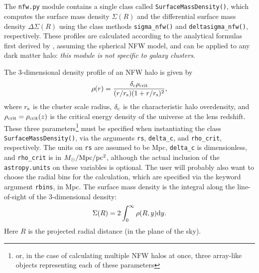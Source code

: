 \documentclass{emulateapj}
\newcommand{\code}{\lstinline[style=codeintext]}
\newcommand{\hcode}{\large\normalfont\texttt} %
\begin{document}

\subsection{\normalfont{\hcode{nfw.py}}}
\label{nfw}

The \code{nfw.py} module contains a single class called \code{SurfaceMassDensity()}, which computes the surface mass density $\Sigma(R)$ and the differential surface mass density $\Delta\Sigma(R)$ using the class methods \code{sigma_nfw()} and \code{deltasigma_nfw()}, respectively. These profiles are calculated according to the analytical formulas first derived by \citet{Wright00}, assuming the spherical NFW model, and can be applied to any dark matter halo: \emph{this module is not specific to galaxy clusters}. 

The 3-dimensional density profile of an NFW halo is given by 
\begin{equation}
\rho(r) = \frac{\delta_{\rm c} \rho_{\rm crit}}{(r/r_{\rm s})(1+r/r_{\rm s})^2},
\end{equation}
where $r_{\rm s}$ is the cluster scale radius, $\delta_{\rm c}$ is the characteristic halo overdensity, and $\rho_{\rm crit} = \rho_{\rm crit}(z)$ is the critical energy density of the universe at the lens redshift. These three parameters\footnote{or, in the case of calculating multiple NFW halos at once, three array-like objects representing each of these parameters} must be specified when instantiating the class \code{SurfaceMassDensity()}, via the arguments \code{rs}, \code{delta_c}, and \code{rho_crit}, respectively. The units on \code{rs} are assumed to be Mpc, \code{delta_c} is dimensionless, and \code{rho_crit} is in $M_{\odot}/{\rm Mpc}/{\rm pc}^2$, although the actual inclusion of the \code{astropy.units} on these variables is optional. The user will probably also want to choose the radial bins for the calculation, which are specified via the keyword argument \code{rbins}, in Mpc. The surface mass density is the integral along the line-of-sight of the 3-dimensional density:
\begin{equation}
\Sigma(R) = 2 \int_0^{\infty} \rho(R,y) {\rm d}y.
\end{equation}
Here $R$ is the projected radial distance (in the plane of the sky).  
\end{document}
